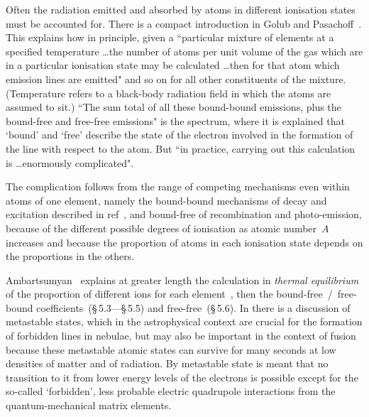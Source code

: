%


Often the radiation emitted and absorbed by atoms in different ionisation states 
must be accounted for.
There is a compact introduction in Golub and Pasachoff~\cite[\S\,3.3.1]{golubpasachoff}.
This explains how in principle, given a ``particular mixture of elements at a specified
temperature \ldots the number of atoms per unit volume of the gas which are in a particular
ionisation state may be calculated \ldots then for that atom which emission lines are
emitted"  and so on for all other constituents of the mixture.
(Temperature refers to a black-body radiation field in which the atoms are assumed to sit.)
 ``The sum total of all
these bound-bound emissions, plus the bound-free and free-free emissions" is the spectrum,
where it is explained that `bound' and `free' describe the state of the electron involved
in the formation of the line with respect to the atom.
But ``in practice, carrying out this calculation is \ldots enormously complicated".

The complication follows from the range of competing mechanisms even within atoms
of one element, namely the bound-bound mechanisms of decay and excitation described in
ref~\cite[\S\,3.2.1]{golubpasachoff}, and bound-free
of recombination and photo-emission, because of the different possible degrees of ionisation
as atomic number~$A$ increases and because the proportion of atoms in each ionisation
state depends on the proportions in the others. 


Ambartsumyan~\cite[\S\,5]{ambartsumyan} explains at greater length the
calculation in \emph{thermal equilibrium} of the proportion of different ions for each
element~\cite[\S\,5.2]{ambartsumyan}, then the
bound-free~/~free-bound coefficients~(\S\,5.3---\S\,5.5) and free-free~(\S\,5.6).
In \cite[\S\,24.1--24.2]{ambartsumyan} there is a discussion of metastable
states, which in the astrophysical context are crucial for the formation of forbidden lines in nebulae,
but may also be important in the context of fusion because these metastable atomic
states can survive for many seconds at low densities of matter and of radiation.
By metastable state is meant that no transition to it from lower energy levels
of the electrons is possible except for the so-called `forbidden', less
probable electric quadrupole interactions from the quantum-mechanical matrix elements.

